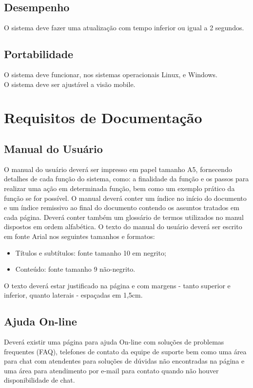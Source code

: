 \subsection{Desempenho}
O sistema deve fazer uma atualização com tempo inferior ou igual a 2 segundos.

\subsection{Portabilidade}
O sistema deve funcionar, nos sistemas operacionais Linux, e Windows.\\
O sistema deve ser ajustável a visão mobile.

\section{Requisitos de Documentação}

\subsection{Manual do Usuário}
O manual do usuário deverá ser impresso em papel tamanho A5, fornecendo detalhes de cada função do sistema, como: a finalidade da função e os passos para realizar uma ação em determinada função, bem como um exemplo prático da função se for possível. O manual deverá conter um índice no início do documento e um índice remissivo ao final do documento contendo os assuntos tratados em cada página. Deverá conter também um glossário de termos utilizados no manul dispostos em ordem alfabética. O texto do manual do usuário deverá ser escrito em fonte Arial nos seguintes tamanhos e formatos:
\begin{itemize}
\item Títulos e subtítulos: fonte tamanho 10 em negrito;
\item Conteúdo: fonte tamanho 9 não-negrito.
\end{itemize} 
O texto deverá estar justificado na página e com margens - tanto superior e inferior, quanto laterais - espaçadas em 1,5cm.

\subsection{Ajuda On-line}
Deverá existir uma página para ajuda On-line com soluções de problemas frequentes (FAQ), telefones de contato da equipe de suporte bem como uma área para chat com atendentes para soluções de dúvidas não encontradas na página e uma área para atendimento por e-mail para contato quando não houver disponibilidade de chat.

